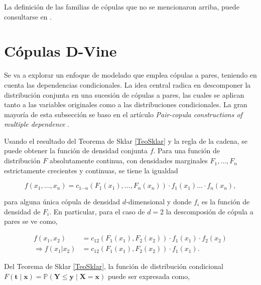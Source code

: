  La definición de las familias de cópulas que no se mencionaron arriba, puede consultarse en \cite{CopulasR}.
 

\section{Cópulas D-Vine}\label{DVines}

Se va a explorar un enfoque de modelado que emplea cópulas a pares, teniendo en cuenta las dependencias condicionales. La idea central radica en descomponer la distribución conjunta en una sucesión de cópulas a pares, las cuales se aplican tanto a las variables originales como a las distribuciones condicionales. La gran mayoría de esta subsección se baso en el artículo \textit{Pair-copula constructions of multiple dependence} \cite{PairCopula}.

Usando el resultado del Teorema de Sklar \ref{TeoSklar} y la regla de la cadena, se puede obtener la función de densidad conjunta $f$. Para una función de distribución $F$ absolutamente continua, con densidades marginales $F_1, \dots, F_n$ estrictamente crecientes y continuas, se tiene la igualdad

\vspace{-0.5cm}
\begin{equation}\label{conjunta}
    f\left( x_1, \dots, x_n\right)=  c_{1 \cdots n} (F_1\left(x_1\right), \ldots, F_n\left(x_n\right) ) \cdot f_1\left(x_1\right) \dots \cdot f_n\left(x_n\right),
\end{equation}

para alguna única cópula de densidad $d$-dimensional y donde $f_i$ es la función de densidad de $F_i$. En particular, para el caso de $d = 2$ la descomposión de cópula a pares se ve como,

\vspace{-0.5cm}
\begin{equation} \label{eq1}
    \begin{split}
        f (x_1, x_2) & = c_{12}(F_1(x_1), F_2(x_2)) \cdot f_1(x_1) \cdot f_2(x_2) \\
      \Rightarrow f\left(x_1 | x_2\right) & = c_{12}(F_1\left(x_1\right), F_2\left(x_2\right)) \cdot f_1\left(x_1\right).
    \end{split}
\end{equation}

Del Teorema de Sklar \ref{TeoSklar}, la función de distribución condicional $F(\mathbf{t} \mid \mathbf{x})=\mathbb{P}(\mathbf{Y} \leq \mathbf{y} \mid \mathbf{X}=\mathbf{x})$ puede ser expresada como,


